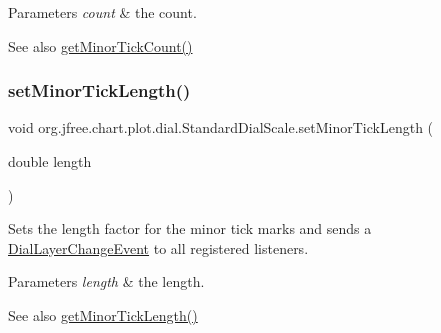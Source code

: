 \begin{DoxyParams}{Parameters}
{\em count} & the count.\\
\hline
\end{DoxyParams}
\begin{DoxySeeAlso}{See also}
\mbox{\hyperlink{classorg_1_1jfree_1_1chart_1_1plot_1_1dial_1_1_standard_dial_scale_afc449f87dcd315c12ecf88720ebd0097}{get\+Minor\+Tick\+Count()}} 
\end{DoxySeeAlso}
\mbox{\label{classorg_1_1jfree_1_1chart_1_1plot_1_1dial_1_1_standard_dial_scale_abbf5ad1e351dcecf1813b61aa830da76}} 
\subsubsection{\texorpdfstring{set\+Minor\+Tick\+Length()}{setMinorTickLength()}}
{\footnotesize\ttfamily void org.\+jfree.\+chart.\+plot.\+dial.\+Standard\+Dial\+Scale.\+set\+Minor\+Tick\+Length (\begin{DoxyParamCaption}\item[{double}]{length }\end{DoxyParamCaption})}

Sets the length factor for the minor tick marks and sends a \mbox{\hyperlink{classorg_1_1jfree_1_1chart_1_1plot_1_1dial_1_1_dial_layer_change_event}{Dial\+Layer\+Change\+Event}} to all registered listeners.


\begin{DoxyParams}{Parameters}
{\em length} & the length.\\
\hline
\end{DoxyParams}
\begin{DoxySeeAlso}{See also}
\mbox{\hyperlink{classorg_1_1jfree_1_1chart_1_1plot_1_1dial_1_1_standard_dial_scale_aee13f2cda92a34a11e9424428099f796}{get\+Minor\+Tick\+Length()}} 
\end{DoxySeeAlso}
\mbox{\label{classorg_1_1jfree_1_1chart_1_1plot_1_1dial_1_1_standard_dial_scale_a5a11cdd5bfc905c2a7b7fe1185845b3d}} 
